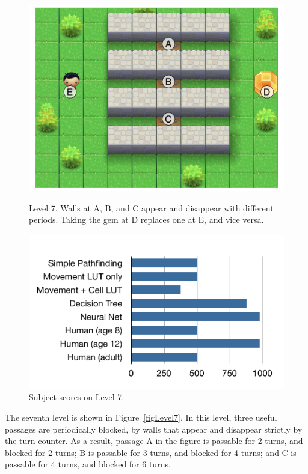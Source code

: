 \documentclass{article}
\begin{document}
\begin{figure}[ht]
\begin{minipage}[t]{0.45\linewidth}
\centering
\includegraphics[width=\textwidth]{figLevel7.pdf}
\caption{Level 7. Walls at A, B, and C appear and disappear with different periods.  Taking the gem at D replaces one at E, and vice versa.}
\label{figLevel7}
\end{minipage}
\hspace{0.5cm}
\begin{minipage}[b]{0.45\linewidth}
\centering
\includegraphics[width=\textwidth]{figScores7.pdf}
\caption{Subject scores on Level 7.}
\label{figScores7}
\end{minipage}
\end{figure}

The seventh level is shown in Figure~\ref{figLevel7}.  In this level, three useful passages are periodically blocked, by walls that appear and disappear strictly by the turn counter.  As a result, passage A in the figure is passable for 2 turns, and blocked for 2 turns; B is passable for 3 turns, and blocked for 4 turns; and C is passable for 4 turns, and blocked for 6 turns.
\end{document}
